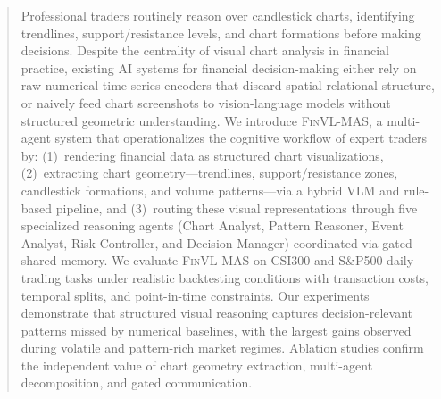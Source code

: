 \begin{abstract}
Professional traders routinely reason over candlestick charts, identifying trendlines, support/resistance levels, and chart formations before making decisions. Despite the centrality of visual chart analysis in financial practice, existing AI systems for financial decision-making either rely on raw numerical time-series encoders that discard spatial-relational structure, or naively feed chart screenshots to vision-language models without structured geometric understanding. We introduce \textsc{FinVL-MAS}, a multi-agent system that operationalizes the cognitive workflow of expert traders by: (1)~rendering financial data as structured chart visualizations, (2)~extracting chart geometry---trendlines, support/resistance zones, candlestick formations, and volume patterns---via a hybrid VLM and rule-based pipeline, and (3)~routing these visual representations through five specialized reasoning agents (Chart Analyst, Pattern Reasoner, Event Analyst, Risk Controller, and Decision Manager) coordinated via gated shared memory. We evaluate \textsc{FinVL-MAS} on CSI300 and S\&P500 daily trading tasks under realistic backtesting conditions with transaction costs, temporal splits, and point-in-time constraints. Our experiments demonstrate that structured visual reasoning captures decision-relevant patterns missed by numerical baselines, with the largest gains observed during volatile and pattern-rich market regimes. Ablation studies confirm the independent value of chart geometry extraction, multi-agent decomposition, and gated communication.
\end{abstract}
